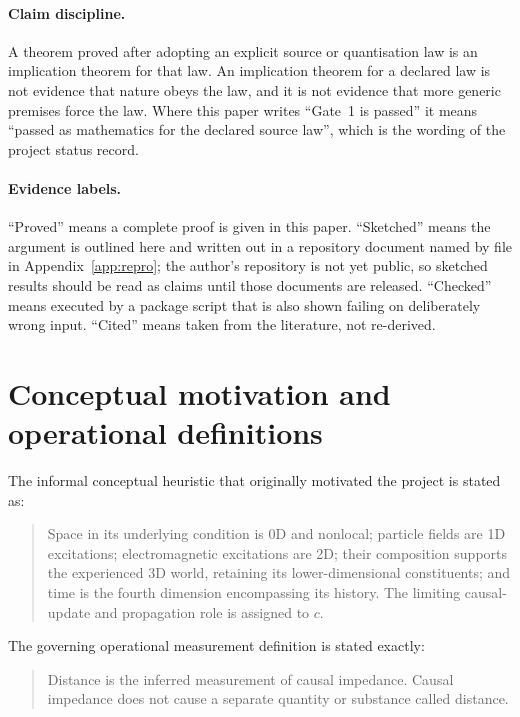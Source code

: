 \documentclass[11pt]{article}
\theoremstyle{definition}
\theoremstyle{remark}
\begin{document}
\paragraph{Claim discipline.} A theorem proved after adopting an explicit source or
quantisation law is an implication theorem for that law. An implication theorem for a
declared law is not evidence that nature obeys the law, and it is not evidence that more
generic premises force the law. Where this paper writes ``Gate~1 is passed'' it means
``passed as mathematics for the declared source law'', which is the wording of the
project status record.

\paragraph{Evidence labels.} ``Proved'' means a complete proof is given in this paper.
``Sketched'' means the argument is outlined here and written out in a repository
document named by file in Appendix~\ref{app:repro}; the author's repository is not yet
public, so sketched results should be read as claims until those documents are released.
``Checked'' means executed by a package script that is also shown failing on
deliberately wrong input. ``Cited'' means taken from the literature, not re-derived.

\section{Conceptual motivation and operational definitions}
\label{sec:foundation}

The informal conceptual heuristic that originally motivated the project is stated as:

\begin{quote}
Space in its underlying condition is 0D and nonlocal; particle fields are 1D
excitations; electromagnetic excitations are 2D; their composition supports the
experienced 3D world, retaining its lower-dimensional constituents; and time is the
fourth dimension encompassing its history. The limiting causal-update and propagation
role is assigned to $c$.
\end{quote}

The governing operational measurement definition is stated exactly:

\begin{quote}
Distance is the inferred measurement of causal impedance. Causal impedance does not
cause a separate quantity or substance called distance.
\end{quote}
\end{document}
